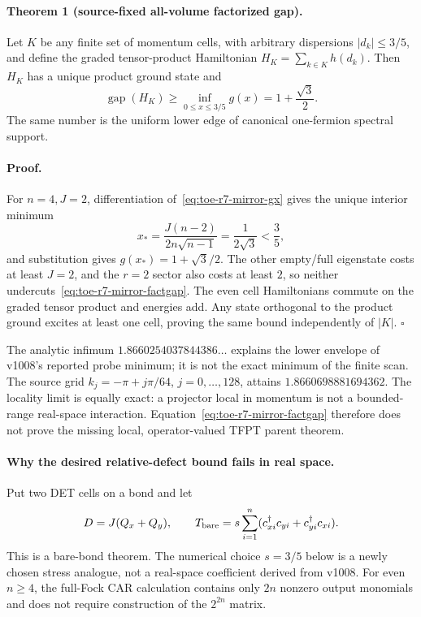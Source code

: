 \paragraph{Theorem 1 (source-fixed all-volume factorized gap).}
Let $K$ be any finite set of momentum cells, with arbitrary dispersions
$|d_k|\leq3/5$, and define the graded tensor-product Hamiltonian
$H_K=\sum_{k\in K}h(d_k)$.  Then $H_K$ has a unique product ground state and
\begin{equation}
 \operatorname{gap}(H_K)\geq
 \inf_{0\leq x\leq3/5}g(x)
 =1+\frac{\sqrt3}{2}.
 \label{eq:toe-r7-mirror-factgap}
\end{equation}
The same number is the uniform lower edge of canonical one-fermion spectral
support.

\paragraph{Proof.}
For $n=4,J=2$, differentiation of~\eqref{eq:toe-r7-mirror-gx} gives the unique interior
minimum
\begin{equation}
 x_*=\frac{J(n-2)}{2n\sqrt{n-1}}=\frac1{2\sqrt3}<\frac35,
\end{equation}
and substitution gives $g(x_*)=1+\sqrt3/2$.  The other empty/full eigenstate
costs at least $J=2$, and the $r=2$ sector also costs at least $2$, so neither
undercuts~\eqref{eq:toe-r7-mirror-factgap}.  The even cell Hamiltonians commute on the graded
tensor product and energies add.  Any state orthogonal to the product ground
excites at least one cell, proving the same bound independently of $|K|$.
\hfill$\square$

The analytic infimum $1.8660254037844386\ldots$ explains the lower envelope of
v1008's reported probe minimum; it is not the exact minimum of the finite scan.
The source grid $k_j=-\pi+j\pi/64$, $j=0,\ldots,128$, attains
$1.8660698881694362$.  The locality limit is equally exact: a projector local
in momentum is not a bounded-range real-space interaction.
Equation~\eqref{eq:toe-r7-mirror-factgap} therefore does not prove the missing local,
operator-valued TFPT parent theorem.

\paragraph{Why the desired relative-defect bound fails in real space.}

Put two DET cells on a bond and let
\begin{equation}
 D=J(Q_x+Q_y),\qquad
 T_{\rm bare}=s\sum_{i=1}^n
 (c_{x i}^\dagger c_{y i}+c_{y i}^\dagger c_{x i}).
 \label{eq:toe-r7-mirror-realbond}
\end{equation}
This is a bare-bond theorem.  The numerical choice $s=3/5$ below is a newly
chosen stress analogue, not a real-space coefficient derived from v1008.
For even $n\geq4$, the full-Fock CAR calculation contains only $2n$ nonzero
output monomials and does not require construction of the $2^{2n}$ matrix.

